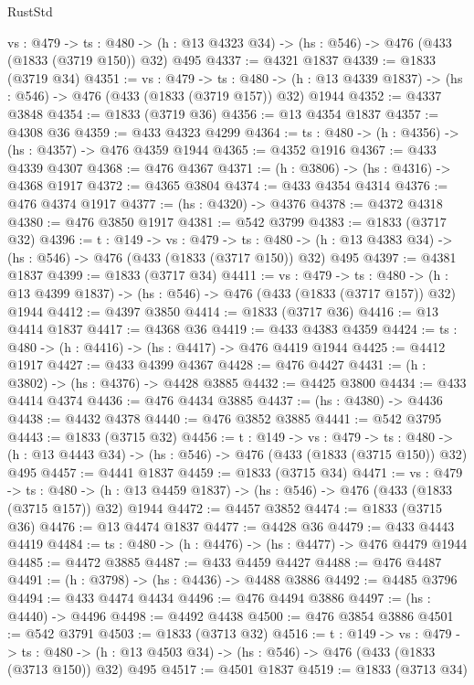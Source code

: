 \begin{lexlean}{RustStd}
\begin{coremodule}
  {vs : @479} ->
  {ts : @480} -> (h : @13 @4323 @34) -> (hs : @546) -> @476 (@433 (@1833 (@3719 @150)) @32) @495
@4337 := @4321 @1837
@4339 := @1833 (@3719 @34)
@4351 := {vs : @479} ->
  {ts : @480} -> (h : @13 @4339 @1837) -> (hs : @546) -> @476 (@433 (@1833 (@3719 @157)) @32) @1944
@4352 := @4337 @3848
@4354 := @1833 (@3719 @36)
@4356 := @13 @4354 @1837
@4357 := @4308 @36
@4359 := @433 @4323 @4299
@4364 := {ts : @480} -> (h : @4356) -> (hs : @4357) -> @476 @4359 @1944
@4365 := @4352 @1916
@4367 := @433 @4339 @4307
@4368 := @476 @4367
@4371 := (h : @3806) -> (hs : @4316) -> @4368 @1917
@4372 := @4365 @3804
@4374 := @433 @4354 @4314
@4376 := @476 @4374 @1917
@4377 := (hs : @4320) -> @4376
@4378 := @4372 @4318
@4380 := @476 @3850 @1917
@4381 := @542 @3799
@4383 := @1833 (@3717 @32)
@4396 := {t : @149} ->
  {vs : @479} ->
  {ts : @480} -> (h : @13 @4383 @34) -> (hs : @546) -> @476 (@433 (@1833 (@3717 @150)) @32) @495
@4397 := @4381 @1837
@4399 := @1833 (@3717 @34)
@4411 := {vs : @479} ->
  {ts : @480} -> (h : @13 @4399 @1837) -> (hs : @546) -> @476 (@433 (@1833 (@3717 @157)) @32) @1944
@4412 := @4397 @3850
@4414 := @1833 (@3717 @36)
@4416 := @13 @4414 @1837
@4417 := @4368 @36
@4419 := @433 @4383 @4359
@4424 := {ts : @480} -> (h : @4416) -> (hs : @4417) -> @476 @4419 @1944
@4425 := @4412 @1917
@4427 := @433 @4399 @4367
@4428 := @476 @4427
@4431 := (h : @3802) -> (hs : @4376) -> @4428 @3885
@4432 := @4425 @3800
@4434 := @433 @4414 @4374
@4436 := @476 @4434 @3885
@4437 := (hs : @4380) -> @4436
@4438 := @4432 @4378
@4440 := @476 @3852 @3885
@4441 := @542 @3795
@4443 := @1833 (@3715 @32)
@4456 := {t : @149} ->
  {vs : @479} ->
  {ts : @480} -> (h : @13 @4443 @34) -> (hs : @546) -> @476 (@433 (@1833 (@3715 @150)) @32) @495
@4457 := @4441 @1837
@4459 := @1833 (@3715 @34)
@4471 := {vs : @479} ->
  {ts : @480} -> (h : @13 @4459 @1837) -> (hs : @546) -> @476 (@433 (@1833 (@3715 @157)) @32) @1944
@4472 := @4457 @3852
@4474 := @1833 (@3715 @36)
@4476 := @13 @4474 @1837
@4477 := @4428 @36
@4479 := @433 @4443 @4419
@4484 := {ts : @480} -> (h : @4476) -> (hs : @4477) -> @476 @4479 @1944
@4485 := @4472 @3885
@4487 := @433 @4459 @4427
@4488 := @476 @4487
@4491 := (h : @3798) -> (hs : @4436) -> @4488 @3886
@4492 := @4485 @3796
@4494 := @433 @4474 @4434
@4496 := @476 @4494 @3886
@4497 := (hs : @4440) -> @4496
@4498 := @4492 @4438
@4500 := @476 @3854 @3886
@4501 := @542 @3791
@4503 := @1833 (@3713 @32)
@4516 := {t : @149} ->
  {vs : @479} ->
  {ts : @480} -> (h : @13 @4503 @34) -> (hs : @546) -> @476 (@433 (@1833 (@3713 @150)) @32) @495
@4517 := @4501 @1837
@4519 := @1833 (@3713 @34)

\end{coremodule}
\end{lexlean}
